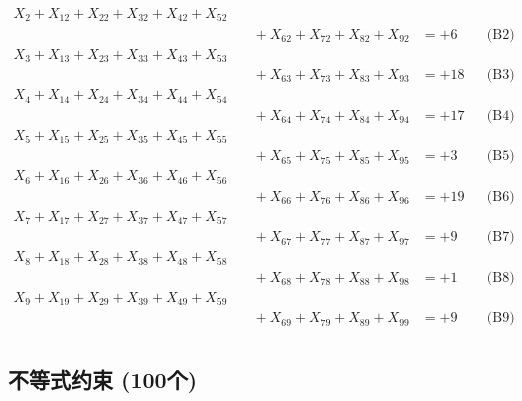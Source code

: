 \documentclass[a4paper,10pt]{article}
\begin{document}
{\begin{align}
X_{2} + X_{12} + X_{22} + X_{32} + X_{42} + X_{52} \\[0.1ex]
&\quad  + X_{62} + X_{72} + X_{82} + X_{92} &= +6 && \text{(B2)} \\
X_{3} + X_{13} + X_{23} + X_{33} + X_{43} + X_{53} \\[0.1ex]
&\quad  + X_{63} + X_{73} + X_{83} + X_{93} &= +18 && \text{(B3)} \\
X_{4} + X_{14} + X_{24} + X_{34} + X_{44} + X_{54} \\[0.1ex]
&\quad  + X_{64} + X_{74} + X_{84} + X_{94} &= +17 && \text{(B4)} \\
\allowbreak
X_{5} + X_{15} + X_{25} + X_{35} + X_{45} + X_{55} \\[0.1ex]
&\quad  + X_{65} + X_{75} + X_{85} + X_{95} &= +3 && \text{(B5)} \\
X_{6} + X_{16} + X_{26} + X_{36} + X_{46} + X_{56} \\[0.1ex]
&\quad  + X_{66} + X_{76} + X_{86} + X_{96} &= +19 && \text{(B6)} \\
X_{7} + X_{17} + X_{27} + X_{37} + X_{47} + X_{57} \\[0.1ex]
&\quad  + X_{67} + X_{77} + X_{87} + X_{97} &= +9 && \text{(B7)} \\
X_{8} + X_{18} + X_{28} + X_{38} + X_{48} + X_{58} \\[0.1ex]
&\quad  + X_{68} + X_{78} + X_{88} + X_{98} &= +1 && \text{(B8)} \\
X_{9} + X_{19} + X_{29} + X_{39} + X_{49} + X_{59} \\[0.1ex]
&\quad  + X_{69} + X_{79} + X_{89} + X_{99} &= +9 && \text{(B9)} \\
\end{align}
}

\subsection{不等式约束 (100个)}
\end{document}
